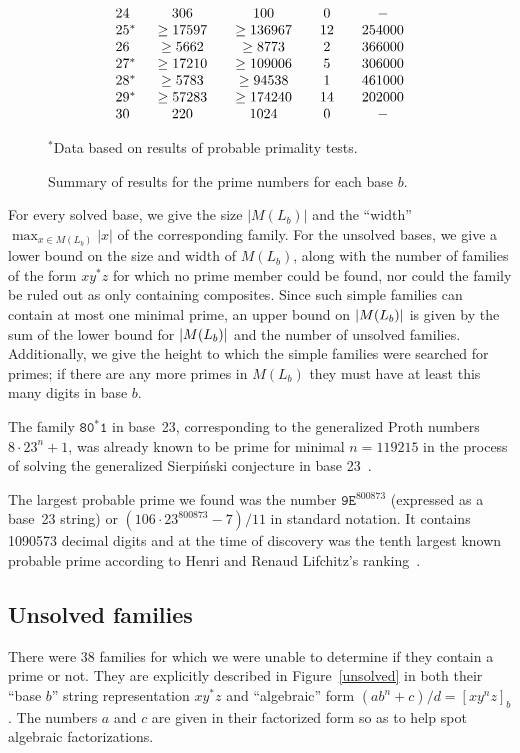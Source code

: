 \documentclass[12pt]{article}
\DeclarePairedDelimiter\abs{\lvert}{\rvert}
\theoremstyle{plain}
\theoremstyle{definition}
\newcommand{\0}{\mathtt{0}}
\newcommand{\1}{\mathtt{1}}
\newcommand{\2}{\mathtt{2}}
\newcommand{\3}{\mathtt{3}}
\newcommand{\4}{\mathtt{4}}
\newcommand{\5}{\mathtt{5}}
\newcommand{\6}{\mathtt{6}}
\newcommand{\7}{\mathtt{7}}
\newcommand{\8}{\mathtt{8}}
\newcommand{\9}{\mathtt{9}}
\newcommand{\updated}[1]{{\color{red}#1}}
\renewcommand{\updated}[1]{#1}
\begin{document}
\begin{figure}
\[\begin{array}{c@{\qquad}c@{\qquad}c@{\qquad}c@{\qquad}c}
24 & 306 & 100 & 0 & - \\ 
25\mathrlap{^*} & \geq17597 & \geq136967 & 12 & \updated{254000} \\ 
26 & \geq5662 & \geq8773 & 2 & \updated{366000} \\ 
27\mathrlap{^*} & \geq17210 & \geq109006 & 5 & \updated{306000} \\ 
28\mathrlap{^*} & \geq5783 & \geq94538 & 1 & \updated{461000} \\
29\mathrlap{^*} & \updated{\geq57283} & \updated{\geq174240} & \updated{14} & \updated{202000} \\
30 & 220 & 1024 & 0 & -
\end{array}\]
\begin{center}$^*$Data based on results of probable primality tests.\end{center}
\caption{Summary of results for the prime numbers for each base $b$.}
\label{resultsfig}
\end{figure}

For every solved base, we give the size $|M(L_b)|$ and the ``width'' $\max_{x \in M(L_b)} |x|$ of
the corresponding family.
For the unsolved bases, we give a lower bound on the size and width of $M(L_b)$,
along with the number of families of the form
$xy^*z$ for which no prime member could be found, nor could the family be
ruled out as only containing composites.  Since such simple families can contain at
most one minimal prime, an upper bound on $\abs{M(L_b)}$ is given by the
sum of the lower bound for $\abs{M(L_b)}$ and the number of unsolved families.
Additionally, we give the height to which the simple families were searched
for primes; if there are any more primes in $M(L_b)$ they must have at least
this many digits in base $b$.

The family $\8\0^*\1$ in base~23, corresponding to the
generalized Proth numbers $8\cdot23^n+1$, was already known to be prime
for minimal $n=119215$ in the process
of solving the generalized Sierpi\'nski conjecture in base 23~\cite{crus}.

\updated{The largest probable prime we found was the number $\mathtt{9E}^{800873}$
(expressed as a base~23 string)
or $(106\cdot23^{800873}-7)/11$ in standard notation.
It contains 1090573 decimal digits and at the time of discovery was the tenth
largest known probable prime according to Henri and Renaud Lifchitz's ranking~\cite{lifc}.}

\subsection{Unsolved families}
\updated{There were 38 families for which we were unable to determine if they contain a prime or not.
They are explicitly described in Figure~\ref{unsolved} in both their ``base $b$'' string representation
$xy^*z$ and ``algebraic'' form $(ab^n+c)/d=[xy^nz]_b$.  The numbers $a$ and $c$ are given in their factorized form
so as to help spot algebraic factorizations.}
\end{document}
